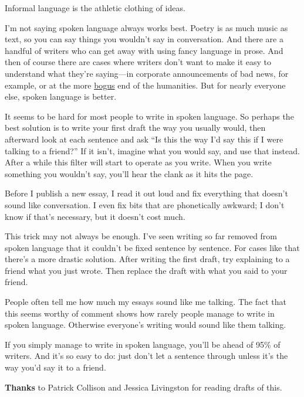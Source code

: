 Informal language is the athletic clothing of ideas.

I'm not saying spoken language always works best. Poetry is as much
music as text, so you can say things you wouldn't say in conversation.
And there are a handful of writers who can get away with using fancy
language in prose. And then of course there are cases where writers
don't want to make it easy to understand what they're saying---in
corporate announcements of bad news, for example, or at the more
\href{https://scholar.google.com/scholar?hl=en&as_sdt=1,5&q=transgression+narrative+postmodern+gender}{bogus}
end of the humanities. But for nearly everyone else, spoken language is
better.

It seems to be hard for most people to write in spoken language. So
perhaps the best solution is to write your first draft the way you
usually would, then afterward look at each sentence and ask ``Is this
the way I'd say this if I were talking to a friend?'' If it isn't,
imagine what you would say, and use that instead. After a while this
filter will start to operate as you write. When you write something you
wouldn't say, you'll hear the clank as it hits the page.

Before I publish a new essay, I read it out loud and fix everything that
doesn't sound like conversation. I even fix bits that are phonetically
awkward; I don't know if that's necessary, but it doesn't cost much.

This trick may not always be enough. I've seen writing so far removed
from spoken language that it couldn't be fixed sentence by sentence. For
cases like that there's a more drastic solution. After writing the first
draft, try explaining to a friend what you just wrote. Then replace the
draft with what you said to your friend.

People often tell me how much my essays sound like me talking. The fact
that this seems worthy of comment shows how rarely people manage to
write in spoken language. Otherwise everyone's writing would sound like
them talking.

If you simply manage to write in spoken language, you'll be ahead of
95\% of writers. And it's so easy to do: just don't let a sentence
through unless it's the way you'd say it to a friend.

\textbf{Thanks} to Patrick Collison and Jessica Livingston for reading
drafts of this.